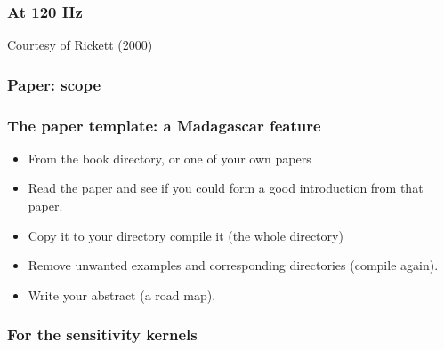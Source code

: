 \begin{frame} \frametitle{At 120 Hz}

Courtesy of Rickett (2000)
 \end{frame}
\cwpnote{}

\begin{frame} \frametitle{Paper: scope}


\end{frame}
\cwpnote{}


\begin{frame} \frametitle{The paper template: a Madagascar feature}

\begin{itemize}
   \item From the book directory, or one of your own papers
   \item Read the paper and see if you could form a good introduction
     from that paper.
   \item Copy it to your directory compile it (the whole directory)
   \item Remove unwanted examples and corresponding directories (compile again).
   \item Write your abstract (a road map).
\end{itemize}

\end{frame}
\cwpnote{}

\begin{frame} \frametitle{For the sensitivity kernels} 



\end{frame}
\cwpnote{}


